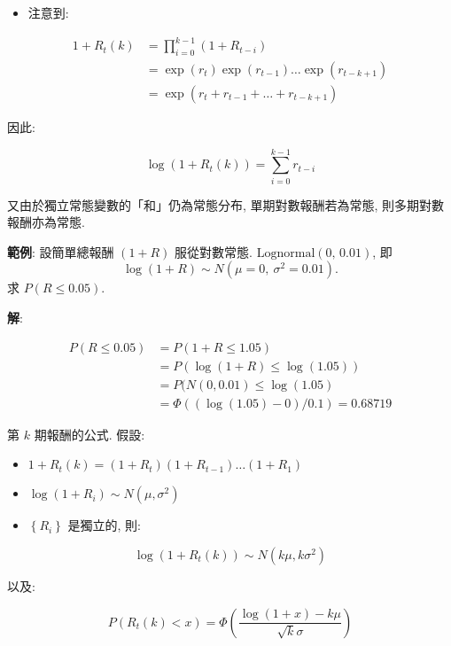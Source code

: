\documentclass[letterpaper]{article}
\begin{document}
		\begin{itemize}
			\item 注意到: 
		\end{itemize}
		
		$$
		\begin{aligned}
			1+R_{t} (k) & =\prod_{i=0}^{k-1}\left (1+R_{t-i}\right) \\
			& =\exp \left (r_{t}\right) \exp \left (r_{t-1}\right) \ldots \exp \left (r_{t-k+1}\right) \\
			& =\exp \left (r_{t}+r_{t-1}+\ldots+r_{t-k+1}\right) 
		\end{aligned}
		$$
		
		因此: 
		
		$$
		\log \left (1+R_{t} (k) \right) =\sum_{i=0}^{k-1} r_{t-i}
		$$
		
		又由於獨立常態變數的「和」仍為常態分布, 單期對數報酬若為常態, 則多期對數報酬亦為常態. 
		
		\textbf{範例}: 設簡單總報酬 $ (1+R) $ 服從對數常態. $\mathrm{Lognormal} (0, \, 0.01) $, 即
		\[
		\log (1+R) \sim N\!\left (\mu=0, \ \sigma^2=0.01\right).
		\]
		求 $P (R \le 0.05) $. 
		
		\textbf{解}: 
		
		$$
		\begin{aligned}
			P (R \leq 0.05) & =P (1+R \leq 1.05) \\
			& =P (\log (1+R) \leq \log (1.05) ) \\
			& =P (N (0, 0.01) \leq \log (1.05) \\
			& =\Phi ( (\log (1.05) -0) / 0.1) =0.68719
		\end{aligned}
		$$
		
		第 $k$ 期報酬的公式. 假設: 
		
		\begin{itemize}
			\item $1+R_{t} (k) =\left (1+R_{t}\right) \left (1+R_{t-1}\right) \ldots\left (1+R_{1}\right) $
			\item $\log \left (1+R_{i}\right) \sim N\left (\mu, \sigma^{2}\right) $
			\item  $\left\{R_{i}\right\}$ 是獨立的, 則: 
		\end{itemize}
		
		$$
		\log \left (1+R_{t} (k) \right) \sim N\left (k \mu, k \sigma^{2}\right) 
		$$
		
		以及: 
		
		$$
		P\left (R_{t} (k) <x\right) =\Phi\left (\frac{\log (1+x) -k \mu}{\sqrt{k} \sigma}\right) 
		$$
		
\end{document}
